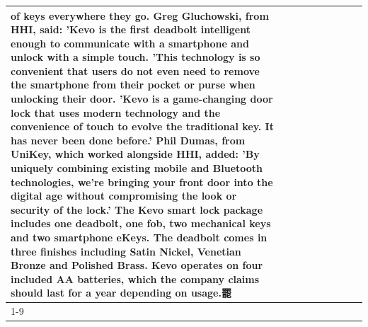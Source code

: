 \begin{table}[H]
\begin{tabular}{lllrlllll}
of keys everywhere they go. Greg Gluchowski, from HHI, said: 'Kevo is the first deadbolt intelligent enough to communicate with a smartphone and unlock with a simple touch. 'This technology is so convenient that users do not even need to remove the smartphone from their pocket or purse when unlocking their door. 'Kevo is a game-changing door lock that uses modern technology and the convenience of touch to evolve the traditional key. It has never been done before.' Phil Dumas, from UniKey, which worked alongside HHI, added: 'By uniquely combining existing mobile and Bluetooth technologies, we’re bringing your front door into the digital age without compromising the look or security of the lock.' The Kevo smart lock package includes one deadbolt, one fob, two mechanical keys and two smartphone eKeys. The deadbolt comes in three finishes including Satin Nickel, Venetian Bronze and Polished Brass. Kevo operates on four included AA batteries, which the company claims should last for a year depending on usage.罷 \\
\cline{1-9}

\end{tabular}
\end{table}
